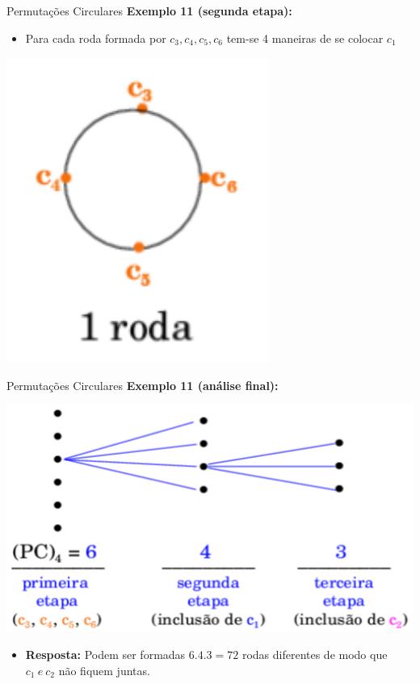 \documentclass[aspectratio=169]{beamer}
\begin{document}
\begin{frame}{Permutações Circulares}
    \textbf{Exemplo 11 (segunda etapa):}

    \vspace{2mm}

    \begin{itemize}
        \item[] Para cada roda formada por $c_3, c_4, c_5, c_6$ tem-se 4 maneiras de se colocar $c_1$
    \end{itemize}

    \begin{center}
        \includegraphics[width=.3\linewidth]{figs/Exemplo11.png}
    \end{center}

\end{frame}

\begin{frame}{Permutações Circulares}
    \textbf{Exemplo 11 (análise final):}

    \begin{center}
        \includegraphics[width=.6\linewidth]{figs/Exemplo11_1.png}
    \end{center}

    \pause

    \begin{itemize}
        \item \textbf{Resposta:} Podem ser formadas $6 . 4 . 3 = 72$ rodas diferentes de modo que $c_1 ~ e ~ c_2$ não fiquem juntas.
    \end{itemize}
\end{frame}
\end{document}
